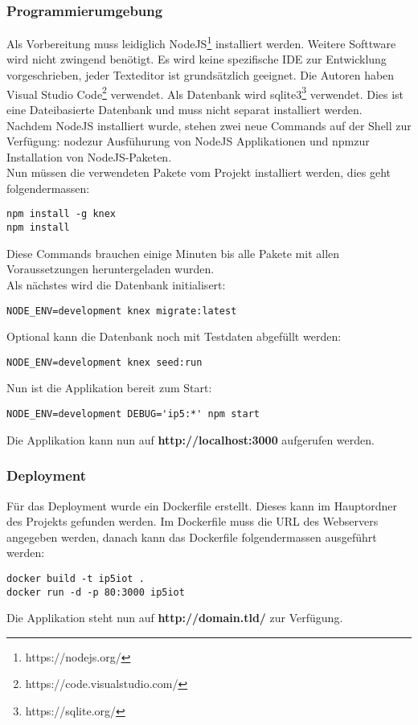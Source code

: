 \subsubsection{Programmierumgebung}
Als Vorbereitung muss leidiglich NodeJS\footnote{https://nodejs.org/} installiert werden. Weitere Softtware wird nicht zwingend benötigt. Es wird keine spezifische IDE zur Entwicklung vorgeschrieben, jeder Texteditor ist grundsätzlich geeignet. Die Autoren haben Visual Studio Code\footnote{https://code.visualstudio.com/} verwendet. Als Datenbank wird sqlite3\footnote{https://sqlite.org/} verwendet. Dies ist eine Dateibasierte Datenbank und muss nicht separat installiert werden.\\[2ex]
%
Nachdem NodeJS installiert wurde, stehen zwei neue Commands auf der Shell zur Verfügung: \glqq node\grqq zur Ausfühurung von NodeJS Applikationen und \glqq npm\grqq zur Installation von NodeJS-Paketen.\\
Nun müssen die verwendeten Pakete vom Projekt installiert werden, dies geht folgendermassen:
\begin{lstlisting}[caption=Installation der Pakete]
npm install -g knex
npm install
\end{lstlisting}
Diese Commands brauchen einige Minuten bis alle Pakete mit allen Voraussetzungen heruntergeladen wurden.\\
%
Als nächstes wird die Datenbank initialisert:
\begin{lstlisting}[caption=Initialisieren der Datenbank]
NODE_ENV=development knex migrate:latest
\end{lstlisting}

Optional kann die Datenbank noch mit Testdaten abgefüllt werden:
\begin{lstlisting}[caption=Testdaten einfügen]
NODE_ENV=development knex seed:run
\end{lstlisting}

Nun ist die Applikation bereit zum Start:
\begin{lstlisting}[caption=Applikation starten]
NODE_ENV=development DEBUG='ip5:*' npm start
\end{lstlisting}

Die Applikation kann nun auf \textbf{http://localhost:3000} aufgerufen werden.
%
\subsubsection{Deployment}
Für das Deployment wurde ein Dockerfile erstellt. Dieses kann im Hauptordner des Projekts gefunden werden. Im Dockerfile muss die URL des Webservers angegeben werden, danach kann das Dockerfile folgendermassen ausgeführt werden:
\begin{lstlisting}[caption=Docker Container starten]
docker build -t ip5iot .
docker run -d -p 80:3000 ip5iot
\end{lstlisting}
Die Applikation steht nun auf \textbf{http://domain.tld/} zur Verfügung.

\clearpage
